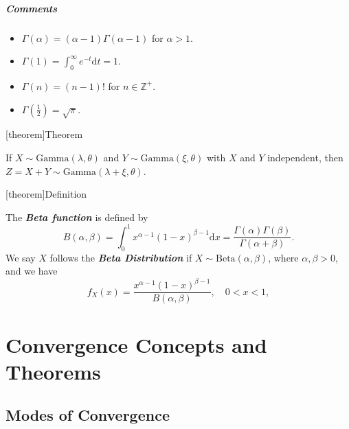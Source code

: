 \documentclass[12pt]{report}
\theoremstyle{definition}
\begin{document}
\paragraph{Comments}
\begin{itemize}
    \item $\Gamma(\alpha)=(\alpha-1)\Gamma(\alpha-1)$ for $\alpha>1$.
    \item $\Gamma(1)=\int_{0}^{\infty} e^{-t}\mathrm{d}t=1$.
    \item $\Gamma(n)=(n-1)!$ for $n\in\mathbb{Z}^+$.
    \item $\Gamma(\frac{1}{2})=\sqrt{\pi}$.
\end{itemize} 

[theorem]{Theorem}
\begin{sum of gamma distributions}
    If $X\sim\text{Gamma}(\lambda,\theta)$ and $Y\sim\text{Gamma}(\xi,\theta)$
    with $X$ and $Y$ independent, then
    $Z=X+Y\sim\text{Gamma}(\lambda+\xi,\theta)$.
\end{sum of gamma distributions}

[theorem]{Definition}
\begin{beta distribution}
    The \textbf{\emph{Beta function}} is defined by
    \[
        B(\alpha,\beta)=\int_{0}^{1} x^{\alpha-1}{(1-x)}^{\beta-1}\mathrm{d}x
        =\frac{\Gamma(\alpha)\Gamma(\beta)}{\Gamma(\alpha+\beta)}.
    \]
    We say $X$ follows the \textbf{\emph{Beta Distribution}} if
    $X\sim\text{Beta}(\alpha,\beta)$, where $\alpha,\beta>0$, and we have
    \[
        f_X(x)=\frac{x^{\alpha-1}{(1-x)}^{\beta-1}}{B(\alpha,\beta)},\quad 
        0<x<1,
    \]
\end{beta distribution}


\chapter{Convergence Concepts and Theorems}

\section{Modes of Convergence}
\end{document}

